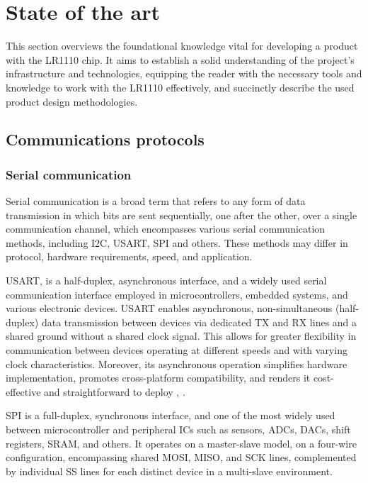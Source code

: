 \section{State of the art} \label{sec:knowledge}
This section overviews the foundational knowledge vital for developing a product with the LR1110 chip. It aims to establish a solid understanding of the project's infrastructure and technologies, equipping the reader with the necessary tools and knowledge to work with the LR1110 effectively, and succinctly describe the used product design methodologies. 

\subsection{Communications protocols}
\subsubsection{Serial communication}
Serial communication is a broad term that refers to any form of data transmission in which bits are sent sequentially, one after the other, over a single communication channel, which encompasses various serial communication methods, including \ac{I2C}, \ac{USART}, \ac{SPI} and others. These methods may differ in protocol, hardware requirements, speed, and application.

\ac{USART}, is a half-duplex, asynchronous interface, and a widely used serial communication interface employed in microcontrollers, embedded systems, and various electronic devices. \ac{USART} enables asynchronous, non-simultaneous (half-duplex) data transmission between devices via dedicated TX and RX lines and a shared ground without a shared clock signal. This allows for greater flexibility in communication between devices operating at different speeds and with varying clock characteristics. Moreover, its asynchronous operation simplifies hardware implementation, promotes cross-platform compatibility, and renders it cost-effective and straightforward to deploy \cite{UART1}, \cite{UART2}.

\ac{SPI} is a full-duplex, synchronous interface, and one of the most widely used between microcontroller and peripheral ICs such as sensors, ADCs, DACs, shift registers, SRAM, and others. It operates on a master-slave model, on a four-wire configuration, encompassing shared \ac{MOSI}, \ac{MISO}, and \ac{SCK} lines, complemented by individual \ac{SS} lines for each distinct device in a multi-slave environment.

